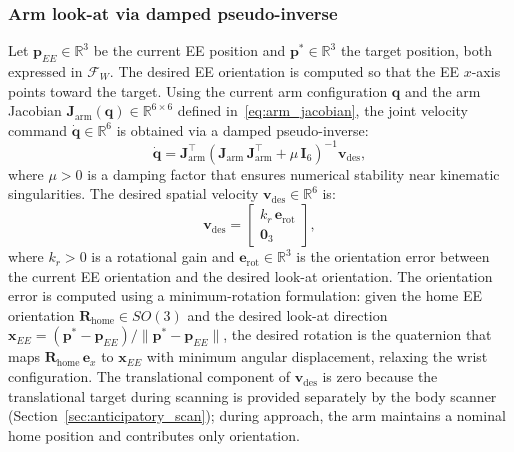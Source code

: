 \subsubsection{Arm look-at via damped pseudo-inverse}
Let $\mathbf{p}_{EE} \in \mathbb{R}^3$ be the current \ac{EE} position and
$\mathbf{p}^* \in \mathbb{R}^3$ the target position, both expressed in
$\mathcal{F}_W$. The desired \ac{EE} orientation is computed so that the
\ac{EE} $x$-axis points toward the target. Using the current arm
configuration $\mathbf{q}$ and the arm Jacobian
$\mathbf{J}_{\mathrm{arm}}(\mathbf{q}) \in \mathbb{R}^{6 \times 6}$
defined in~\eqref{eq:arm_jacobian}, the joint velocity command
$\dot{\mathbf{q}} \in \mathbb{R}^6$ is obtained via a damped
pseudo-inverse:
\begin{equation}
  \dot{\mathbf{q}} =
  \mathbf{J}_{\mathrm{arm}}^\top
  \!\left(
    \mathbf{J}_{\mathrm{arm}}\,\mathbf{J}_{\mathrm{arm}}^\top
    + \mu\,\mathbf{I}_6
  \right)^{-1}
  \mathbf{v}_{\mathrm{des}},
  \label{eq:damped_pinv}
\end{equation}
where $\mu > 0$ is a damping factor that ensures numerical stability near
kinematic singularities. The desired spatial velocity
$\mathbf{v}_{\mathrm{des}} \in \mathbb{R}^6$ is:
\begin{equation}
  \mathbf{v}_{\mathrm{des}} =
  \begin{bmatrix}
    k_r\,\mathbf{e}_{\mathrm{rot}} \\
    \mathbf{0}_3
  \end{bmatrix},
  \label{eq:vdes}
\end{equation}
where $k_r > 0$ is a rotational gain and $\mathbf{e}_{\mathrm{rot}} \in
\mathbb{R}^3$ is the orientation error between the current \ac{EE}
orientation and the desired look-at orientation. The orientation error is
computed using a minimum-rotation formulation: given the home \ac{EE}
orientation $\mathbf{R}_{\mathrm{home}} \in SO(3)$ and the desired look-at
direction $\mathbf{x}_{EE} = (\mathbf{p}^* - \mathbf{p}_{EE}) /
\|\mathbf{p}^* - \mathbf{p}_{EE}\|$, the desired rotation is the quaternion
that maps $\mathbf{R}_{\mathrm{home}}\,\mathbf{e}_x$ to $\mathbf{x}_{EE}$
with minimum angular displacement, relaxing the wrist configuration. The
translational component of $\mathbf{v}_{\mathrm{des}}$ is zero because the
translational target during scanning is provided separately by the body
scanner (Section~\ref{sec:anticipatory_scan}); during approach, the arm
maintains a nominal home position and contributes only orientation.


